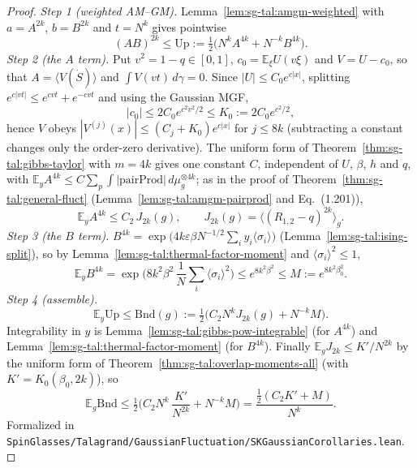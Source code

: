 \begin{proof}
  \leanok
\emph{Step 1 (weighted AM--GM).} Lemma~\ref{lem:sg-tal:amgm-weighted} with $a=A^{2k}$, $b=B^{2k}$ and $t=N^k$ gives pointwise
\[
(AB)^{2k}\le\mathrm{Up}:=\tfrac12\Big(N^kA^{4k}+N^{-k}B^{4k}\Big).
\]
\emph{Step 2 (the $A$ term).} Put $v^2=1-q\in[0,1]$, $c_0=\mathbb E_\xi U(v\xi)$ and $V=U-c_0$, so that $A=\langle V(\dot S)\rangle$ and $\int V(vt)\,d\gamma=0$. Since $|U|\le C_0e^{c|x|}$, splitting $e^{c|vt|}\le e^{cvt}+e^{-cvt}$ and using the Gaussian MGF,
\[
|c_0|\le2C_0e^{c^2v^2/2}\le K_0:=2C_0e^{c^2/2},
\]
hence $V$ obeys $|V^{(j)}(x)|\le(C_j+K_0)e^{c|x|}$ for $j\le8k$ (subtracting a constant changes only the order-zero derivative). The uniform form of Theorem~\ref{thm:sg-tal:gibbs-taylor} with $m=4k$ gives one constant $C$, independent of $U$, $\beta$, $h$ and $q$, with $\mathbb E_yA^{4k}\le C\sum_p\int|\mathrm{pairProd}|\,d\mu_g^{\otimes4k}$; as in the proof of Theorem~\ref{thm:sg-tal:general-fluct} (Lemma~\ref{lem:sg-tal:amgm-pairprod} and Eq.~(1.201)),
\[
\mathbb E_yA^{4k}\le C_2\,J_{2k}(g),\qquad J_{2k}(g)=\langle(R_{1,2}-q)^{2k}\rangle_g .
\]
\emph{Step 3 (the $B$ term).} $B^{4k}=\exp\big(4k\varepsilon\beta N^{-1/2}\sum_iy_i\langle\sigma_i\rangle\big)$ (Lemma~\ref{lem:sg-tal:ising-split}), so by Lemma~\ref{lem:sg-tal:thermal-factor-moment} and $\langle\sigma_i\rangle^2\le1$,
\[
\mathbb E_yB^{4k}=\exp\Big(8k^2\beta^2\,\frac1N\sum_i\langle\sigma_i\rangle^2\Big)\le e^{8k^2\beta^2}\le M:=e^{8k^2\beta_0^2}.
\]
\emph{Step 4 (assemble).}
\[
\mathbb E_y\mathrm{Up}\le\mathrm{Bnd}(g):=\tfrac12\Big(C_2N^kJ_{2k}(g)+N^{-k}M\Big).
\]
Integrability in $y$ is Lemma~\ref{lem:sg-tal:gibbs-pow-integrable} (for $A^{4k}$) and Lemma~\ref{lem:sg-tal:thermal-factor-moment} (for $B^{4k}$). Finally $\mathbb E_gJ_{2k}\le K'/N^{2k}$ by the uniform form of Theorem~\ref{thm:sg-tal:overlap-moments-all} (with $K'=K_0(\beta_0,2k)$), so
\[
\mathbb E_g\mathrm{Bnd}\le\tfrac12\Big(C_2N^k\,\frac{K'}{N^{2k}}+N^{-k}M\Big)=\frac{\tfrac12(C_2K'+M)}{N^k}.
\]
Formalized in \texttt{SpinGlasses/Talagrand/GaussianFluctuation/SKGaussianCorollaries.lean}.
\end{proof}

